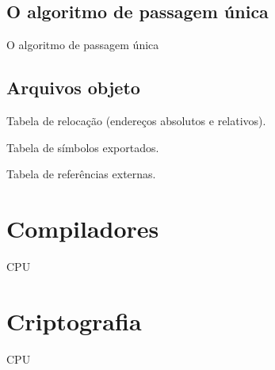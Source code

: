 \subsection{O algoritmo de passagem única}

O algoritmo de passagem única

\subsection{Arquivos objeto}

Tabela de relocação (endereços absolutos e relativos).

Tabela de símbolos exportados.

Tabela de referências externas.

\section{Compiladores}

CPU

\section{Criptografia}

CPU
